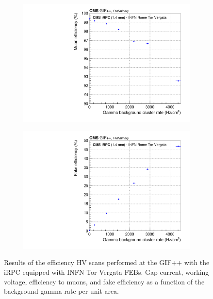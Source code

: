 \begin{figure}[H]
\begin{subfigure}{.5\linewidth}
			\includegraphics[width = \linewidth]{fig/chapt6/CMS-iRPC-INFN-MuonEfficiency_vs_Rate.pdf}
			\caption{\label{fig:iRPC_INFN_perf:C}}
		\end{subfigure}
		\begin{subfigure}{.5\linewidth}
		    \centering
			\includegraphics[width = \linewidth]{fig/chapt6/CMS-iRPC-INFN-FakeEfficiency_vs_Rate.pdf}
			\caption{\label{fig:iRPC_INFN_perf:D}}
		\end{subfigure}
		\caption{\label{fig:iRPC_INFN_perf} Results of the efficiency HV scans performed at the GIF++ with the iRPC equipped with INFN Tor Vergata FEBs.  Gap current,  working voltage,  efficiency to muons, and  fake efficiency as a function of the background gamma rate per unit area.}
    \end{figure}
    
